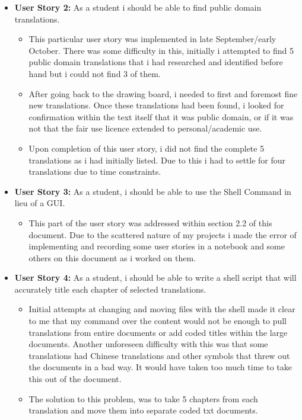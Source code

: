 \documentclass{article}
\begin{document}
\begin{itemize}
\item{\textbf{User Story 2:} As a student i should be able to find public domain translations.}
\begin{itemize}
\item{This particular user story was implemented in late September/early October. There was some difficulty in this, initially i attempted to find 5 public domain translations that i had researched and identified before hand but i could not find 3 of them.}
\item{After going back to the drawing board, i needed to first and foremost fine new translations. Once these translations had been found, i looked for confirmation within the text itself that it was public domain, or if it was not that the fair use licence extended to personal/academic use. }
\item{Upon completion of this user story, i did not find the complete 5 translations as i had initially listed. Due to this i had to settle for four translations due to time constraints.}
\end{itemize}
\item{\textbf{User Story 3:} As a student, i should be able to use the Shell Command in lieu of a GUI.}
\begin{itemize}
\item{This part of the user story was addressed within section 2.2 of this document. Due to the scattered nature of my projects i made the error of implementing and recording some user stories in a notebook and some others on this document as i worked on them.} 
\end{itemize}
\item{\textbf{User Story 4:} As a student, i should be able to write a shell script that will accurately title each chapter of selected translations.}
\begin{itemize}
\item{Initial attempts at changing and moving files with the shell made it clear to me that my command over the content would not be enough to pull translations from entire documents or add coded titles within the large documents. Another unforeseen difficulty with this was that some translations had Chinese translations and other symbols that threw out the documents in a bad way. It would have taken too much time to take this out of the document.}
\item{The solution to this problem, was to take 5 chapters from each translation and move them into separate coded txt documents.}


\end{itemize}
\end{itemize}
\end{document}
